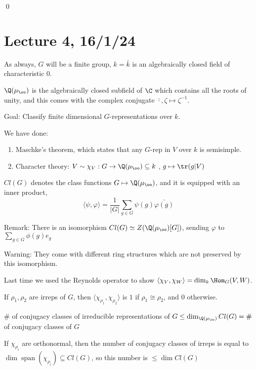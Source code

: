 \documentclass[x11names,reqno,14pt]{extarticle}
\DeclareMathOperator{\Span}{span}
\begin{document}
\qed

\section*{Lecture 4, 16/1/24}

As always, $G$ will be a finite group, $k = \bar{k}$ is an algebraically closed field of characteristic 0. 

$\Q(\mu_\oo)$ is the algebraically closed subfield of $\C$ which contains all the roots of unity, and this comes with the complex conjugate $\bar{\cdot}, \zeta\mapsto\zeta^{-1}$. 

Goal: Classify finite dimensional $G$-representations over $k$. 

We have done:
\begin{enumerate}

\item Maschke's theorem, which states that any $G$-rep in $V$ over $k$ is semisimple. 

\item Character theory: $V \sim \chi_V:G\to\Q(\mu_\oo)\subseteq k$ , $g \mapsto \tr(g|V)$

\end{enumerate}


$Cl(G)$ denotes the class functions $G \mapsto \Q(\mu_\oo)$, and it is equipped with an inner product, 
\[
\langle\psi,\varphi\rangle = \frac{1}{|G|}\sum_{g\in G}\psi(g)\bar{\varphi(g)}
\]

Remark: There is an isomorphism $Cl(G) \simeq Z(\Q(\mu_\oo)[G])$, sending $\varphi$ to $\sum_{g\in G}\phi(g)e_g$

Warning: They come with different ring structures which are not preserved by this isomorphism. 

Last time we used the Reynolds operator to show $\langle\chi_V,\chi_W\rangle = \dim_k\Hom_G(V, W)$. 

If $\rho_1,\rho_2$ are irreps of $G$, then $\langle\chi_{\rho_1},\chi_{\rho_2}\rangle$ is $1$ if $\rho_1\cong\rho_2$, and 0 otherwise. 

\cor

$\#$ of conjugacy classes of irreducible representations of $G \leq \dim_{\Q(\mu_\oo)}Cl(G) = \#$ of conjugacy classes of $G$

\proof

If $\chi_{\rho_i}$ are orthonormal, then the number of conjugacy classes of irreps is equal to $\dim \Span(\chi_{\rho_i}) \subseteq Cl(G)$, so this number is $\leq \dim Cl(G)$
\end{document}
